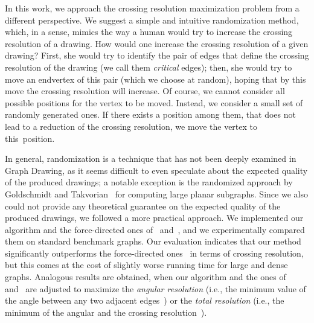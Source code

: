 \documentclass[runningheads]{llncs}
\begin{document}
In this work, we approach the crossing resolution maximization problem from a different perspective. We suggest a simple and intuitive randomization method,
which, in a sense, mimics the way a human would try to increase the crossing resolution of a drawing. How would one increase the crossing resolution of a given drawing? First, she would try to identify the pair of edges that define the crossing resolution of the drawing (we call them \emph{critical} edges); then, she would try to move an endvertex of this pair (which we choose at random), hoping that by this move the crossing resolution will increase. Of course, we cannot consider all possible positions for the vertex to be moved. Instead, we consider a small set of randomly generated ones. If there exists a position among them, that does not lead to a reduction of the crossing resolution, we move the vertex to this~position.

In general, randomization is a technique that has not been deeply examined in Graph Drawing, as it seems difficult to even speculate about the expected quality of the produced drawings; a notable exception is the randomized approach by Goldschmidt and Takvorian~\cite{DBLP:journals/networks/GoldschmidtT94} for computing large planar subgraphs. Since we also could not provide any theoretical guarantee on the expected quality of the produced drawings, 
we followed a more practical approach. We implemented our algorithm and the force-directed ones of~\cite{DBLP:journals/cj/ArgyriouBS13} and~\cite{DBLP:journals/vlc/HuangEHL13}, and we experimentally compared them on standard benchmark graphs.
Our evaluation indicates that our method significantly outperforms the force-directed ones~\cite{DBLP:journals/cj/ArgyriouBS13,DBLP:journals/vlc/HuangEHL13} in terms of crossing resolution, but this comes at the cost of slightly worse running time
for large and dense graphs. Analogous results are obtained, when our algorithm and the ones of~\cite{DBLP:journals/cj/ArgyriouBS13} and~\cite{DBLP:journals/vlc/HuangEHL13} are adjusted to maximize  the \emph{angular resolution} (i.e., the minimum value of the angle between any two adjacent edges~\cite{DBLP:journals/siamcomp/FormannHHKLSWW93}) or the \emph{total resolution} (i.e., the minimum of the angular and the crossing resolution~\cite{DBLP:journals/cj/ArgyriouBS13}).
\end{document}
